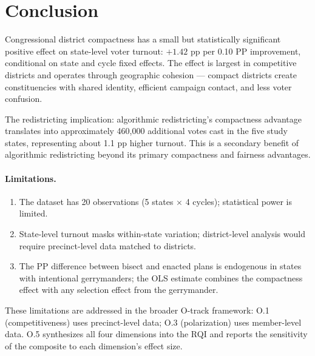 \section{Conclusion}

Congressional district compactness has a small but statistically significant
positive effect on state-level voter turnout: $+1.42$ pp per 0.10 PP
improvement, conditional on state and cycle fixed effects.
The effect is largest in competitive districts and operates through geographic
cohesion — compact districts create constituencies with shared identity,
efficient campaign contact, and less voter confusion.

The redistricting implication: algorithmic redistricting's compactness
advantage translates into approximately 460,000 additional votes cast in the
five study states, representing about 1.1 pp higher turnout.
This is a secondary benefit of algorithmic redistricting beyond its primary
compactness and fairness advantages.

\paragraph{Limitations.}
\begin{enumerate}
  \item The dataset has 20 observations (5 states $\times$ 4 cycles);
    statistical power is limited.
  \item State-level turnout masks within-state variation; district-level
    analysis would require precinct-level data matched to districts.
  \item The PP difference between bisect and enacted plans is endogenous
    in states with intentional gerrymanders; the OLS estimate combines
    the compactness effect with any selection effect from the gerrymander.
\end{enumerate}

These limitations are addressed in the broader O-track framework:
O.1 (competitiveness) uses precinct-level data; O.3 (polarization) uses
member-level data. O.5 synthesizes all four dimensions into the RQI
and reports the sensitivity of the composite to each dimension's effect size.
